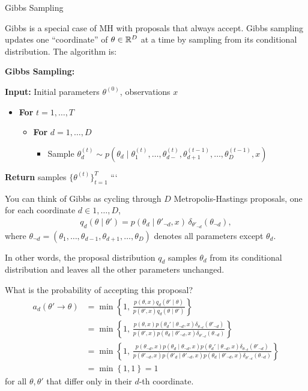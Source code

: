 \documentclass[aspectratio=169]{beamer}
\begin{document}
\begin{frame}[t,allowframebreaks]{Gibbs Sampling}\label{gibbs-sampling}

Gibbs is a special case of MH with proposals that always accept. Gibbs
sampling updates one ``coordinate'' of \(\theta \in \mathbb{R}^D\) at a time
by sampling from its conditional distribution. The algorithm is:

\textbf{Gibbs Sampling:}

\textbf{Input:} Initial parameters \(\theta^{(0)}\), observations \(x\)

\begin{itemize}
\item
  \textbf{For} \(t=1,\ldots, T\)

  \begin{itemize}
  \item
    \textbf{For} \(d=1,\ldots, D\)

    \begin{itemize}
    \item
      Sample
      \(\theta_d^{(t)} \sim p(\theta_d \mid \theta_{1}^{(t)}, \ldots, \theta_{d-}^{(t)}, \theta_{d+1}^{(t-1)}, \ldots, \theta_D^{(t-1)}, x)\)
    \end{itemize}
  \end{itemize}
\end{itemize}

\textbf{Return} samples \(\{\theta^{(t)}\}_{t=1}^T\) ```

You can think of Gibbs as cycling through \(D\) Metropolis-Hastings
proposals, one for each coordinate \(d \in 1,\ldots,D\), \begin{align*}
q_d(\theta \mid \theta') = p(\theta_d \mid \theta'_{\neg d}, x) \, \delta_{\theta'_{\neg d}}(\theta_{\neg d}),
\end{align*} where
\(\theta_{\neg d} = (\theta_1, \ldots, \theta_{d-1}, \theta_{d+1}, \ldots, \theta_D)\)
denotes all parameters except \(\theta_d\).

In other words, the proposal distribution \(q_d\) samples \(\theta_d\)
from its conditional distribution and leaves all the other parameters
unchanged.

What is the probability of accepting this proposal? \begin{align*}
a_d(\theta' \to \theta) 
&= \min \left\{ 1, \, \frac{p(\theta, x) q_d(\theta' \mid \theta)}{p(\theta', x) q_d(\theta \mid \theta')} \right\} \\
&= \min \left\{ 1, \, \frac{p(\theta, x) p(\theta_d' \mid \theta_{\neg d}, x) \delta_{\theta_{\neg d}}(\theta'_{\neg d})}{p(\theta', x) p(\theta_d \mid \theta'_{\neg d}, x) \delta_{\theta'_{\neg d}}(\theta_{\neg d})} \right\} \\
&= \min \left\{ 1, \, \frac{p(\theta_{\neg d}, x) p(\theta_d \mid \theta_{\neg d}, x) p(\theta_d' \mid \theta_{\neg d}, x) \delta_{\theta_{\neg d}}(\theta'_{\neg d})}{p(\theta'_{\neg d}, x) p(\theta'_d \mid \theta'_{\neg d}, x) p(\theta_d \mid \theta'_{\neg d}, x) \delta_{\theta'_{\neg d}}(\theta_{\neg d})} \right\} \\
&= \min \left\{1, 1 \right\} = 1
\end{align*} for all \(\theta, \theta'\) that differ only in their
\(d\)-th coordinate.


\end{frame}
\end{document}
